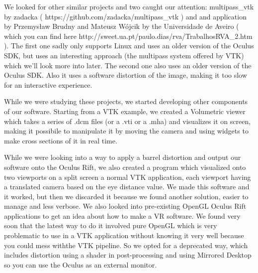 \documentclass[11pt]{article} %
\begin{document}
We looked for other similar projects and two caught our attention: multipass\_vtk by zadacka ( https://github.com/zadacka/multipass\_vtk ) and and application by  Przemysław Brudny and Mateusz Wójcik by the Universidade de Aveiro ( which you can find here http://sweet.ua.pt/paulo.dias/rva/TrabalhosRVA\_2.htm ).
The first one sadly only supports Linux and uses an older version of  the Oculus SDK, but uses an interesting approach (the multipass system offered by VTK) which we'll look more into later.
The second one also uses an older version of the Oculus SDK. Also it uses a software distortion of the image, making it too slow for an interactive experience.

While we were studying these projects, we started developing other components of our software.
Starting from a VTK example, we created a Volumetric viewer which takes a series of .dcm files (or a .vti or a .mha) and visualizes it on screen, making it possibile to manipulate it by moving the camera and using widgets to make cross sections of it in real time.

While we were looking into a way to apply a barrel distortion and output our software onto the Oculus Rift, we also created a program which visualized onto two viewports on a split screen a normal VTK application, each viewport having a translated camera based on the eye distance value. We made this software and it worked, but then we discarded it because we found another solution, easier to manage and less verbose.
We also looked into pre-existing OpenGL Oculus Rift applications to get an idea about how to make a VR software. We found very soon that the latest way to do it involved pure OpenGL which is very problematic to use in a VTK application without knowing it very well because you could mess withthe VTK pipeline. So we opted for a deprecated way, which includes distortion using a shader in post-processing and using Mirrored Desktop so you can use the Oculus as an external monitor.
\end{document}
